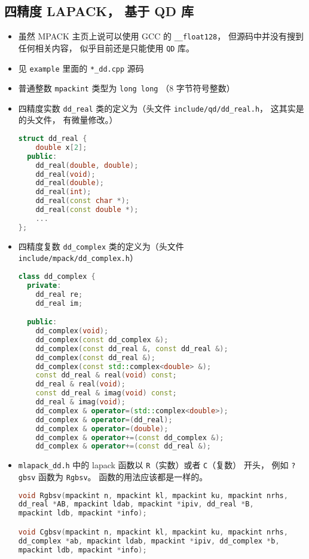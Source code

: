 \subsection{四精度 LAPACK， 基于 QD 库}
\begin{itemize}
\item 虽然 MPACK 主页上说可以使用 GCC 的 \verb`__float128`， 但源码中并没有搜到任何相关内容， 似乎目前还是只能使用 \verb`QD` 库。
\item 见 \verb`example` 里面的 \verb`*_dd.cpp` 源码
\item 普通整数 \verb`mpackint` 类型为 \verb`long long` （8 字节符号整数）
\item 四精度实数 \verb`dd_real` 类的定义为（头文件 \verb`include/qd/dd_real.h`， 这其实是 的头文件， 有微量修改。）
\begin{lstlisting}[language=cpp]
struct dd_real {
    double x[2];
  public:
    dd_real(double, double);
    dd_real(void);
    dd_real(double);
    dd_real(int);
    dd_real(const char *);
    dd_real(const double *);
    ...
};
\end{lstlisting}
\item 四精度复数 \verb`dd_complex` 类的定义为（头文件 \verb`include/mpack/dd_complex.h`）
\begin{lstlisting}[language=cpp]
class dd_complex {
  private:
    dd_real re;
    dd_real im;

  public:
    dd_complex(void);
    dd_complex(const dd_complex &);
    dd_complex(const dd_real &, const dd_real &);
    dd_complex(const dd_real &);
    dd_complex(const std::complex<double> &);
    const dd_real & real(void) const;
    dd_real & real(void);
    const dd_real & imag(void) const;
    dd_real & imag(void);
    dd_complex & operator=(std::complex<double>);
    dd_complex & operator=(dd_real);
    dd_complex & operator=(double);
    dd_complex & operator+=(const dd_complex &);
    dd_complex & operator+=(const dd_real &);
\end{lstlisting}
\item \verb`mlapack_dd.h` 中的 lapack 函数以 \verb`R`（实数）或者 \verb`C`（复数） 开头， 例如 \verb`?gbsv` 函数为 \verb`Rgbsv`。 函数的用法应该都是一样的。
\begin{lstlisting}[language=cpp]
void Rgbsv(mpackint n, mpackint kl, mpackint ku, mpackint nrhs,
dd_real *AB, mpackint ldab, mpackint *ipiv, dd_real *B,
mpackint ldb, mpackint *info);

void Cgbsv(mpackint n, mpackint kl, mpackint ku, mpackint nrhs,
dd_complex *ab, mpackint ldab, mpackint *ipiv, dd_complex *b,
mpackint ldb, mpackint *info);
\end{lstlisting}
\end{itemize}

